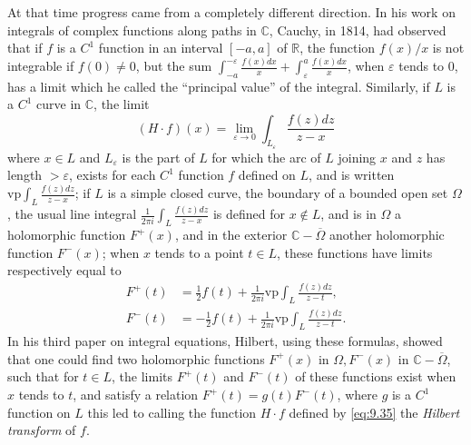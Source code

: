 \documentclass[12pt,a4paper,leqno,twoside]{extbook}
\newcommand{\C}{\mathbb{C}}
\newcommand{\R}{\mathbb{R}}
\begin{document}
At that time progress came from a completely different direction. In his work on integrals of complex functions along paths in \(\C\), Cauchy, in 1814, had observed that if \(f\) is a \(C^1\) function in an interval \([-a,a]\) of \(\R\), the function \(f(x)/x\) is not integrable if \(f(0) \neq 0\), but the sum \(\int_{-a}^{-\varepsilon} \frac{f(x)dx}{x} + \int_\varepsilon^a \frac{f(x)dx}{x}\), when \(\varepsilon\) tends to 0, has a limit which he called the ``principal value'' of the integral. Similarly, if \(L\) is a \(C^1\) curve in \(\C\), the limit
\begin{equation}
    \label{eq:9.35}
    (H \cdot f)(x) = \lim_{\varepsilon \to 0} \int_{L_\varepsilon} \frac{f(z)dz}{z-x}
\end{equation}
where \(x \in L\) and \(L_\varepsilon\) is the part of \(L\) for which the arc of \(L\) joining \(x\) and \(z\) has length \(> \varepsilon\), exists for each \(C^1\) function \(f\) defined on \(L\), and is written \(\text{vp} \int_L \frac{f(z)dz}{z-x}\); if \(L\) is a simple closed curve, the boundary of a bounded open set \(\Omega\), the usual line integral \(\frac{1}{2\pi i} \int_L \frac{f(z)dz}{z-x}\) is defined for \(x \not\in L\), and is in \(\Omega\) a holomorphic function \(F^+(x)\), and in the exterior \(\C - \overline{\Omega}\) another holomorphic function \(F^-(x)\); when \(x\) tends to a point \(t \in L\), these functions have limits respectively equal to
\[
    \begin{aligned}
        F^+(t) &= \frac{1}{2} f(t) + \frac{1}{2\pi i} \text{vp} \int_L \frac{f(z)dz}{z - t}, \\
        F^-(t) &= -\frac{1}{2} f(t) + \frac{1}{2\pi i} \text{vp} \int_L \frac{f(z)dz}{z - t}.
    \end{aligned}
\]
In his third paper on integral equations, Hilbert, using these formulas, showed that one could find two holomorphic functions \(F^+(x)\) in \(\Omega, F^-(x)\) in \(\C - \overline{\Omega}\), such that for \(t \in L\), the limits \(F^+(t)\) and \(F^-(t)\) of these functions exist when \(x\) tends to \(t\), and satisfy a relation \(F^+(t) = g(t)F^-(t)\), where \(g\) is a \(C^1\) function on \(L\) \cite[p.~81--108]{112} this led to calling the function \(H \cdot f\) defined by \eqref{eq:9.35} the \emph{Hilbert transform} of \(f\).
\end{document}
